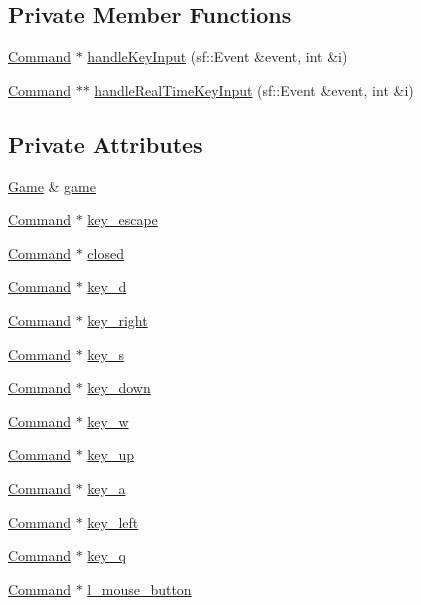 \subsection*{Private Member Functions}
\begin{DoxyCompactItemize}
\item 
\hyperlink{class_command}{Command} $\ast$ \hyperlink{class_engine_input_handler_a6b350fc8a379b04d36b2a60d4d673dcd}{handle\+Key\+Input} (sf\+::\+Event \&event, int \&i)
\item 
\hyperlink{class_command}{Command} $\ast$$\ast$ \hyperlink{class_engine_input_handler_a7e4a2c1a4cacf7ba3129c1e3a998de53}{handle\+Real\+Time\+Key\+Input} (sf\+::\+Event \&event, int \&i)
\end{DoxyCompactItemize}
\subsection*{Private Attributes}
\begin{DoxyCompactItemize}
\item 
\hyperlink{class_game}{Game} \& \hyperlink{class_engine_input_handler_a449d615b9968227381db153f57b7299d}{game}
\item 
\hyperlink{class_command}{Command} $\ast$ \hyperlink{class_engine_input_handler_ab64489773b1416e375218c236a22189a}{key\+\_\+escape}
\item 
\hyperlink{class_command}{Command} $\ast$ \hyperlink{class_engine_input_handler_ae7a6851ee3c22f14b78adc75de5cee56}{closed}
\item 
\hyperlink{class_command}{Command} $\ast$ \hyperlink{class_engine_input_handler_a0a8c3435c45eaa96f64c90476fe7f245}{key\+\_\+d}
\item 
\hyperlink{class_command}{Command} $\ast$ \hyperlink{class_engine_input_handler_a14eaaf6e8b2bcfe25cf1341e583bd830}{key\+\_\+right}
\item 
\hyperlink{class_command}{Command} $\ast$ \hyperlink{class_engine_input_handler_a59ae4ad6379aa180dcd7d858049dac62}{key\+\_\+s}
\item 
\hyperlink{class_command}{Command} $\ast$ \hyperlink{class_engine_input_handler_a863861091ad125fc57b72e319bd9b1e1}{key\+\_\+down}
\item 
\hyperlink{class_command}{Command} $\ast$ \hyperlink{class_engine_input_handler_a8be64818183cb4f9b906ff8694450d3e}{key\+\_\+w}
\item 
\hyperlink{class_command}{Command} $\ast$ \hyperlink{class_engine_input_handler_a46e2d81b780fe8bb344bb176ff2ee3a9}{key\+\_\+up}
\item 
\hyperlink{class_command}{Command} $\ast$ \hyperlink{class_engine_input_handler_a94fabe03a12102cec196570f7fb99dd0}{key\+\_\+a}
\item 
\hyperlink{class_command}{Command} $\ast$ \hyperlink{class_engine_input_handler_af778d434ad01423978eaecc5d392ba3b}{key\+\_\+left}
\item 
\hyperlink{class_command}{Command} $\ast$ \hyperlink{class_engine_input_handler_a0229e1c2b48f4049c77124aef8340909}{key\+\_\+q}
\item 
\hyperlink{class_command}{Command} $\ast$ \hyperlink{class_engine_input_handler_adf6145027b272f46e7c1381d4c905892}{l\+\_\+mouse\+\_\+button}
\end{DoxyCompactItemize}
